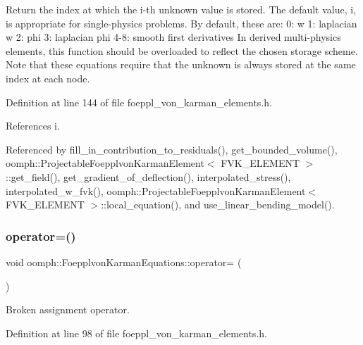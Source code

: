 Return the index at which the i-\/th unknown value is stored. The default value, i, is appropriate for single-\/physics problems. By default, these are\+: 0\+: w 1\+: laplacian w 2\+: phi 3\+: laplacian phi 4-\/8\+: smooth first derivatives In derived multi-\/physics elements, this function should be overloaded to reflect the chosen storage scheme. Note that these equations require that the unknown is always stored at the same index at each node. 



Definition at line 144 of file foeppl\+\_\+von\+\_\+karman\+\_\+elements.\+h.



References i.



Referenced by fill\+\_\+in\+\_\+contribution\+\_\+to\+\_\+residuals(), get\+\_\+bounded\+\_\+volume(), oomph\+::\+Projectable\+Foepplvon\+Karman\+Element$<$ F\+V\+K\+\_\+\+E\+L\+E\+M\+E\+N\+T $>$\+::get\+\_\+field(), get\+\_\+gradient\+\_\+of\+\_\+deflection(), interpolated\+\_\+stress(), interpolated\+\_\+w\+\_\+fvk(), oomph\+::\+Projectable\+Foepplvon\+Karman\+Element$<$ F\+V\+K\+\_\+\+E\+L\+E\+M\+E\+N\+T $>$\+::local\+\_\+equation(), and use\+\_\+linear\+\_\+bending\+\_\+model().

\mbox{\label{classoomph_1_1FoepplvonKarmanEquations_a99922811dcc40c96e4a06cd0e678b254}} 
\subsubsection{\texorpdfstring{operator=()}{operator=()}}
{\footnotesize\ttfamily void oomph\+::\+Foepplvon\+Karman\+Equations\+::operator= (\begin{DoxyParamCaption}\item[{const \hyperlink{classoomph_1_1FoepplvonKarmanEquations}{Foepplvon\+Karman\+Equations} \&}]{ }\end{DoxyParamCaption})\hspace{0.3cm}{\ttfamily [inline]}}



Broken assignment operator. 



Definition at line 98 of file foeppl\+\_\+von\+\_\+karman\+\_\+elements.\+h.



